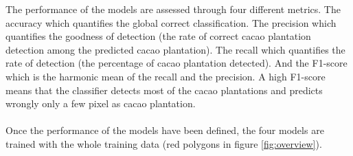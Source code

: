 \documentclass[a4paper, 12pt]{article}
\begin{document}
            The performance of the models are assessed through four different metrics. The accuracy which quantifies the global correct classification. The precision which quantifies the goodness of detection (the rate of correct cacao plantation detection among the predicted cacao plantation). The recall which quantifies the rate of detection (the percentage of cacao plantation detected). And the F1-score which is the harmonic mean of the recall and the precision. A high F1-score means that the classifier detects most of the cacao plantations and predicts wrongly only a few pixel as cacao plantation. \\
            \\
            Once the performance of the models have been defined, the four models are trained with the whole training data (red polygons in figure \ref{fig:overview}).
\end{document}
